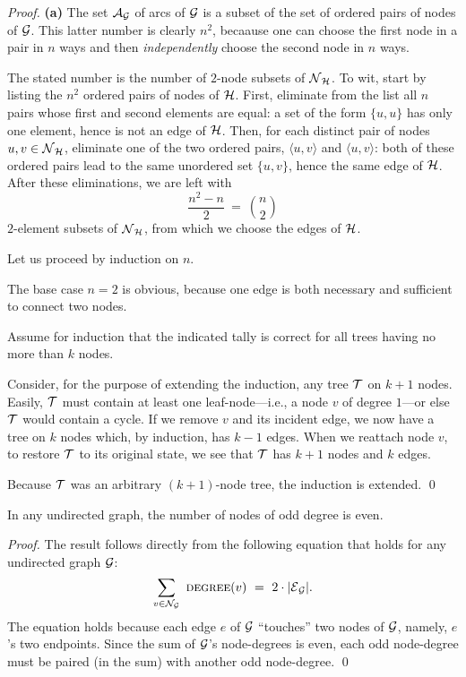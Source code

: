 \begin{proof}
{\bf (a)}
The set $\mbox{$\cal A$}_{\mbox{{\scriptsize $\cal G$}}}$ of arcs of $\mbox{$\cal G$}$ is a subset of the set of ordered
pairs of nodes of $\mbox{$\cal G$}$.  This latter number is clearly $n^2$, becaause
one can choose the first node in a pair in $n$ ways and then {\em
  independently} choose the second node in $n$ ways.

\smallskip

The stated number is the number of $2$-node subsets of $\mbox{$\cal N$}_{\mbox{{\scriptsize $\cal H$}}}$.  To
wit, start by listing the $n^2$ ordered pairs of nodes of $\mbox{$\cal H$}$.
First, eliminate from the list all $n$ pairs whose first and second
elements are equal: a set of the form $\{ u,u\}$ has only one element,
hence is not an edge of $\mbox{$\cal H$}$.  Then, for each distinct pair of nodes
$u, v \in \mbox{$\cal N$}_{\mbox{{\scriptsize $\cal H$}}}$, eliminate one of the two ordered pairs, $\langle
u,v \rangle$ and $\langle u,v \rangle$: both of these ordered pairs
lead to the same unordered set $\{ u,v\}$, hence the same edge of
$\mbox{$\cal H$}$.  After these eliminations, we are left with
\[ \frac{n^2 - n}{2} \ = \ {n \choose 2} \]
$2$-element subsets of $\mbox{$\cal N$}_{\mbox{{\scriptsize $\cal H$}}}$, from which we choose the edges of
$\mbox{$\cal H$}$.

\smallskip

Let us proceed by induction on $n$.

The base case $n=2$ is obvious, because one edge is both necessary and
sufficient to connect two nodes.

Assume for induction that the indicated tally is correct for all trees
having no more than $k$ nodes.

Consider, for the purpose of extending the induction, any tree $\mbox{$\cal T$}$ on
$k+1$ nodes.  Easily, $\mbox{$\cal T$}$ must contain at least one leaf-node---i.e.,
a node $v$ of degree $1$---or else $\mbox{$\cal T$}$ would contain a cycle.  If we
remove $v$ and its incident edge, we now have a tree on $k$ nodes
which, by induction, has $k-1$ edges.  When we reattach node $v$, to
restore $\mbox{$\cal T$}$ to its original state, we see that $\mbox{$\cal T$}$ has $k+1$ nodes
and $k$ edges.

Because $\mbox{$\cal T$}$ was an arbitrary $(k+1)$-node tree, the induction is
extended.  \qed
\end{proof}


\begin{prop}
\label{thm:even-num-odd-degrees}
In any undirected graph, the number of nodes of odd degree is even.
\end{prop}

\begin{proof}
The result follows directly from the following equation that holds for
any undirected graph $\mbox{$\cal G$}$:
\[ \sum_{v \in {\cal N}_{\cal G}} \ \mbox{\sc degree}(v) \ = \ 2 \cdot
|\mbox{$\cal E$}_{\cal G}|.
\]
The equation holds because each edge $e$ of $\mbox{$\cal G$}$ ``touches'' two nodes
of $\mbox{$\cal G$}$, namely, $e$'s two endpoints.  Since the sum of $\mbox{$\cal G$}$'s
node-degrees is even, each odd node-degree must be paired (in the sum)
with another odd node-degree.  \qed
\end{proof}

